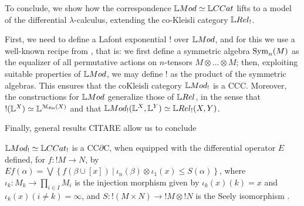 %

%
%








To conclude, we show how the correspondence $\Mod\simeq \GMet$ lifts to a model of the differential $\lambda$-calculus, extending the co-Kleisli category $\LREL_{!}$. 

First, we need to define a Lafont exponential $!$ over $\Mod$, and for this we use a well-known recipe from \cite{Mellies2018, Manzo2013}, that is: we first define a symmetric algebra $\mathrm{Sym}_{n}(M)$ as the equalizer of all permutative actions on $n$-tensors $M\otimes \dots \otimes M$; then, exploiting suitable properties of $\Mod$, we may define $!$ as the product of the symmetric algebras.  
This ensures that the coKleisli category $\Mod_{!}$ is a CCC.
Moreover, the constructions for $\Mod$ generalize those of $\LREL$, in the sense that $!(\mathbb{L}^{X})\simeq \mathbb{L}^{\mathcal{M}_{\mathrm{fin}}(X)}$ and that $\Mod_{!}(\Lawv^{X},\Lawv^{Y})\simeq \LREL_{!}(X,Y)$.


Finally, general results {\color{red}CITARE} allow us to conclude 
\begin{theorem}
$\Mod_{!}\simeq\GMet_{!}$ is a CC$\partial$C, when equipped with 
the differential operator $E$ defined, for $f:!M\to N$, by 
$Ef(\alpha)=
\bigvee\left\{
f(\beta\cup [x]) \ \Big \vert  \ 
\iota_{n}(\beta)\otimes \iota_{1}(x) \leq S(\alpha)
\right\}
$, where $\iota_{k}: M_{k}\to \prod_{i\in I}M_{i}$ is the injection morphism given by $\iota_{k}(x)( k)=x$ and $\iota_{k}(x)(i\neq k)=\infty$,
and $S: !(M\times N)\to !M\otimes !N$ is the Seely isomorphism \cite{Mellies2018}.
\end{theorem}




